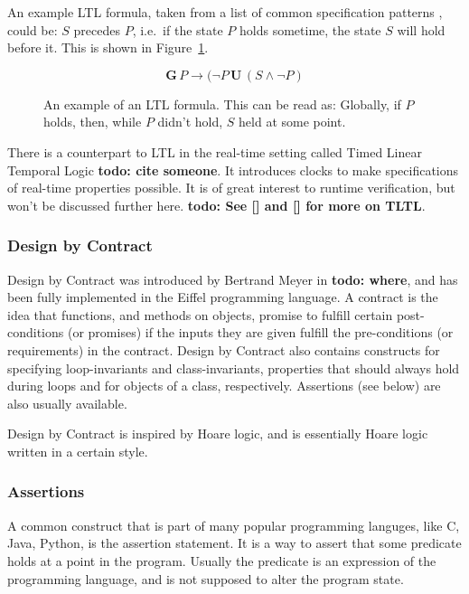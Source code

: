 \documentclass[a4paper,11pt]{kth-mag}
\newcommand{\todo}[1]{\textbf{todo: #1}}
\begin{document}
An example LTL formula, taken from a list of common specification patterns
\cite{dwyer99patterns}, could be: $S$ precedes $P$, i.e.\, if the state $P$ holds
sometime, the state $S$ will hold before it. This is shown in
Figure~\ref{figure-ltl}.

\begin{figure}[h!]

\[
\boldsymbol{G} \, P \rightarrow (\neg P \, \boldsymbol{U} \, (S \wedge \neg P)
\]

\caption{An example of an LTL formula. This can be read as: Globally, if $P$
holds, then, while $P$ didn't hold, $S$ held at some point.}
\label{figure-ltl}
\end{figure}

There is a counterpart to LTL in the real-time setting called Timed Linear
Temporal Logic \todo{cite someone}. It introduces clocks to make specifications
of real-time properties possible. It is of great interest to runtime
verification, but won't be discussed further here. \todo{See [] and [] for more
on TLTL}.


\subsubsection{Design by Contract}

Design by Contract was introduced by Bertrand Meyer in \todo{where}, and has
been fully implemented in the Eiffel programming language. A contract is the
idea that functions, and methods on objects, promise to fulfill certain
post-conditions (or promises) if the inputs they are given fulfill the
pre-conditions (or requirements) in the contract. Design by Contract also
contains constructs for specifying loop-invariants and class-invariants,
properties that should always hold during loops and for objects of a class,
respectively. Assertions (see below) are also usually available.

Design by Contract is inspired by Hoare logic, and is essentially Hoare logic
written in a certain style.


\subsubsection{Assertions}

A common construct that is part of many popular programming languges, like C,
Java, Python, is the assertion statement. It is a way to assert that some
predicate holds at a point in the program. Usually the predicate is an
expression of the programming language, and is not supposed to alter the
program state.
\end{document}
